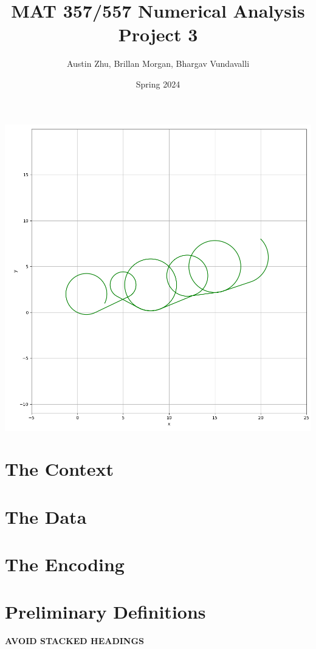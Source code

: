 \documentclass{article}
\title{MAT 357/557 Numerical Analysis Project 3}
\author{Austin Zhu, Brillan Morgan, Bhargav Vundavalli}
\date{Spring 2024}
\begin{document}
\maketitle

\begin{center}
\includegraphics[width=1.0\linewidth]{Plots/CoverPlot.png}
\newpage
\end{center}



\section{The Context}

\section{The Data}

\section{The Encoding}

\section{Preliminary Definitions}
\textbf{AVOID STACKED HEADINGS}
\end{document}
